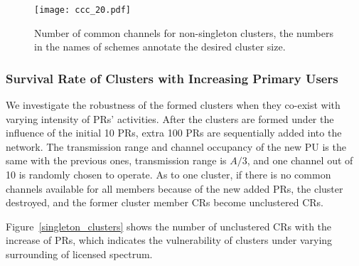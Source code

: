 \begin{figure}[ht!]
  \centering
  \texttt{[image: ccc\_20.pdf]}
  \caption{Number of common channels for non-singleton clusters, the numbers in the names of schemes annotate the desired cluster size.}
  \label{ccc_per_nonsingleton}
\end{figure}

\subsubsection*{Survival Rate of Clusters with Increasing Primary Users}
We investigate the robustness of the formed clusters when they co-exist with varying intensity of PRs' activities.
After the clusters are formed under the influence of the initial 10 PRs, extra 100 PRs are sequentially added into the network.
The transmission range and channel occupancy of the new PU is the same with the previous ones, \ie transmission range is $A/3$, and one channel out of 10 is randomly chosen to operate.
As to one cluster, if there is no common channels available for all members because of the new added PRs, the cluster destroyed, and the former cluster member CRs become unclustered CRs.

Figure~\ref{singleton_clusters} shows the number of unclustered CRs with the increase of PRs, which indicates the vulnerability of clusters under varying surrounding of licensed spectrum.


